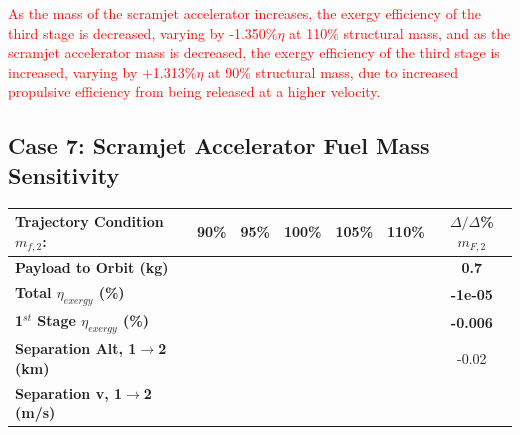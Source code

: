 \textcolor{red}{
As the mass of the scramjet accelerator increases, the exergy efficiency of the third stage is decreased, varying by -1.350\%$\eta$ at 110\% structural mass, and as the scramjet accelerator mass is decreased, the exergy efficiency of the third stage is increased, varying by +1.313\%$\eta$ at 90\% structural mass, due to increased propulsive efficiency from being released at a higher velocity. }


\subsection{Case 7: Scramjet Accelerator Fuel Mass Sensitivity} \label{sec:fuelmassNoReturn}

\begin{table}[!ht] %
\begin{tabular}{l c c c c c c} 
	\hline \textbf{Trajectory Condition}   \qquad  $m_{f,2}$:
	&90\%
	&95\%
	&100\%
	&105\%
	&110\%
	& $\Delta/\Delta$\%$m_{F,2}$
	\\
	\hline \textbf{Payload to Orbit (kg)}
	& \textbf{\PayloadToOrbitmFuelNinetyNoReturn}
	& \textbf{\PayloadToOrbitmFuelNinetyFiveNoReturn}
	& \textbf{\PayloadToOrbitmFuelStandardNoReturn}
	& \textbf{\PayloadToOrbitmFuelOneHundredFiveNoReturn}
	& \textbf{\PayloadToOrbitmFuelOneHundredTenNoReturn}
	&\textbf{0.7}
	\\
	\textbf{Total $\eta_{exergy}$ (\%)}
	& \textbf{\totalExergyEffmFuelNinetyNoReturn}
	& \textbf{\totalExergyEffmFuelNinetyFiveNoReturn}
	& \textbf{\totalExergyEffmFuelStandardNoReturn}
	& \textbf{\totalExergyEffmFuelOneHundredFiveNoReturn}
	& \textbf{\totalExergyEffmFuelOneHundredTenNoReturn}
	& \textbf{-1e-05}
	\\
	\hline 
	\textbf{1$^{st}$ Stage $\eta_{exergy}$ (\%)}
	& \textbf{\firstExergyEffmFuelNinetyNoReturn}
	& \textbf{\firstExergyEffmFuelNinetyFiveNoReturn}
	& \textbf{\firstExergyEffmFuelStandardNoReturn}
	& \textbf{\firstExergyEffmFuelOneHundredFiveNoReturn}
	& \textbf{\firstExergyEffmFuelOneHundredTenNoReturn}
	& \textbf{-0.006}
	\\
	\textbf{Separation Alt, 1$\rightarrow$2 (km)}
	& \firstsecondSeparationAltmFuelNinetyNoReturn
	& \firstsecondSeparationAltmFuelNinetyFiveNoReturn
	& \firstsecondSeparationAltmFuelStandardNoReturn
	& \firstsecondSeparationAltmFuelOneHundredFiveNoReturn
	& \firstsecondSeparationAltmFuelOneHundredTenNoReturn
	&-0.02
	\\
	\textbf{Separation v, 1$\rightarrow$2 (m/s)}
	& \firstsecondSeparationvmFuelNinetyNoReturn

\end{tabular}
\end{table}

